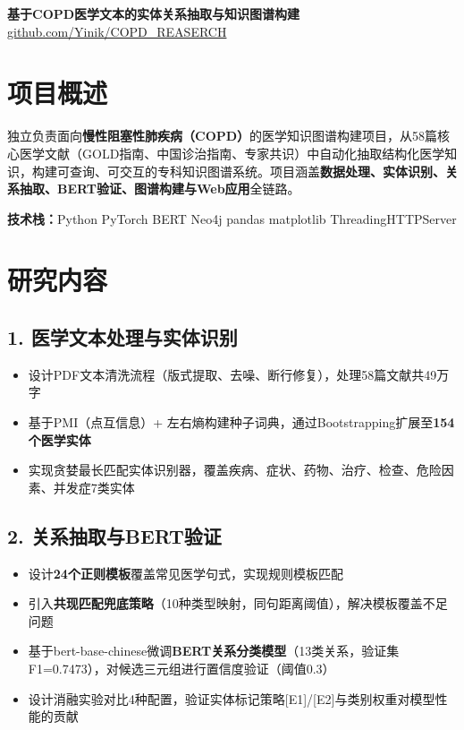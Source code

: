 \documentclass[11pt,a4paper]{article}
\begin{document}
\begin{center}
{\LARGE\bfseries\color{darkgray} 基于COPD医学文本的实体关系抽取与知识图谱构建}\\[6pt]
{\color{lightgray} \href{https://github.com/Yinik/COPD_REASERCH}{github.com/Yinik/COPD\_REASERCH}}
\end{center}

\vspace{8pt}

\section{项目概述}

独立负责面向\textbf{慢性阻塞性肺疾病（COPD）}的医学知识图谱构建项目，从58篇核心医学文献（GOLD指南、中国诊治指南、专家共识）中自动化抽取结构化医学知识，构建可查询、可交互的专科知识图谱系统。项目涵盖\textbf{数据处理、实体识别、关系抽取、BERT验证、图谱构建与Web应用}全链路。

\vspace{4pt}
\noindent\textbf{技术栈：}Python \textbar{} PyTorch \textbar{} BERT \textbar{} Neo4j \textbar{} pandas \textbar{} matplotlib \textbar{} ThreadingHTTPServer

\section{研究内容}

\subsection*{1. 医学文本处理与实体识别}
\begin{itemize}
    \item 设计PDF文本清洗流程（版式提取、去噪、断行修复），处理58篇文献共49万字
    \item 基于PMI（点互信息）+ 左右熵构建种子词典，通过Bootstrapping扩展至\textbf{154个医学实体}
    \item 实现贪婪最长匹配实体识别器，覆盖疾病、症状、药物、治疗、检查、危险因素、并发症7类实体
\end{itemize}

\subsection*{2. 关系抽取与BERT验证}
\begin{itemize}
    \item 设计\textbf{24个正则模板}覆盖常见医学句式，实现规则模板匹配
    \item 引入\textbf{共现匹配兜底策略}（10种类型映射，同句距离阈值），解决模板覆盖不足问题
    \item 基于bert-base-chinese微调\textbf{BERT关系分类模型}（13类关系，验证集F1=0.7473），对候选三元组进行置信度验证（阈值0.3）
    \item 设计消融实验对比4种配置，验证实体标记策略[E1]/[E2]与类别权重对模型性能的贡献
\end{itemize}
\end{document}

